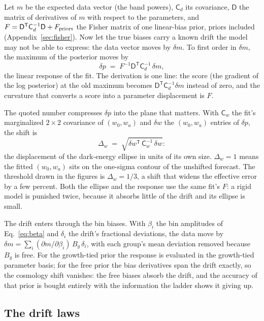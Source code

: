 \documentclass[11pt]{article}
\newcommand{\T}{^{\mathsf{T}}}
\begin{document}
Let $m$ be the expected data vector (the band powers), $\mathsf{C}_d$
its covariance, $\mathsf{D}$ the matrix of derivatives of $m$ with
respect to the parameters, and
$F = \mathsf{D}\T \mathsf{C}_d^{-1} \mathsf{D} + F_{\rm priors}$ the
Fisher matrix of one linear-bias prior, priors included
(Appendix~\ref{sec:fisher}).  Now let the true biases carry a known
drift the model may not be able to express: the data vector
moves by $\delta m$.  To first order in $\delta m$, the maximum of
the posterior moves by
\begin{equation}
  \delta p \;=\; F^{-1} \mathsf{D}\T \mathsf{C}_d^{-1}\, \delta m ,
  \label{eq:fisherbias}
\end{equation}
the linear response of the fit.  The derivation is one line: the
score (the gradient of the log posterior) at the old maximum becomes
$\mathsf{D}\T \mathsf{C}_d^{-1} \delta m$ instead of zero, and the
curvature that converts a score into a parameter displacement is
$F$.

The quoted number compresses $\delta p$ into the plane that matters.
With $\mathsf{C}_w$ the fit's marginalized $2 \times 2$ covariance
of $(w_0, w_a)$ and $\delta w$ the $(w_0, w_a)$ entries of
$\delta p$, the shift is
\begin{equation}
  \Delta_w \;=\; \sqrt{\delta w\T\, \mathsf{C}_w^{-1}\, \delta w} :
  \label{eq:shiftw}
\end{equation}
the displacement of the dark-energy ellipse in units of its own size.
$\Delta_w = 1$ means the fitted $(w_0, w_a)$ sits on the one-sigma
contour of the unshifted forecast.  The threshold drawn in the
figures is $\Delta_w = 1/3$, a shift that widens the effective error
by a few percent.  Both the ellipse and the response use the same
fit's $F$: a rigid model is punished twice, because it absorbs
little of the drift and its ellipse is small.

The drift enters through the bin biases.  With $\beta_i$ the bin
amplitudes of Eq.~\eqref{eq:beta} and $\delta_i$ the drift's
fractional deviations, the data move by
$\delta m = \sum_i (\partial m / \partial \beta_i)\, B_g\, \delta_i$,
with each group's mean deviation removed because $B_g$ is free.  For
the growth-tied prior the response is evaluated in the growth-tied parameter basis;
for the free prior the bias derivatives span the drift exactly,
so the cosmology shift vanishes: the free biases absorb the drift,
and the accuracy of that prior is bought entirely with the information
the ladder shows it giving up.

\subsection{The drift laws}
\label{sec:driftlaws}
\end{document}
